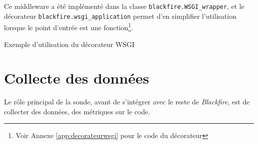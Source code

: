 Ce middleware a été implémenté dans la classe \verb|blackfire.WSGI_wrapper|, et le décorateur \verb|blackfire.wsgi_application| permet d'en simplifier l'utilisation lorsque le point d'entrée est une fonction\footnote{Voir Annexe \vref{app:decorateurwsgi} pour le code du décorateur}.

\begin{listing}[H]
\caption{Exemple d'utilisation du décorateur WSGI}
\end{listing}






  
  \chapter[Collecte]{Collecte des données}
Le rôle principal de la sonde, avant de s'intégrer avec le reste de \emph{Blackfire}, est de collecter des données, des métriques sur le code.


